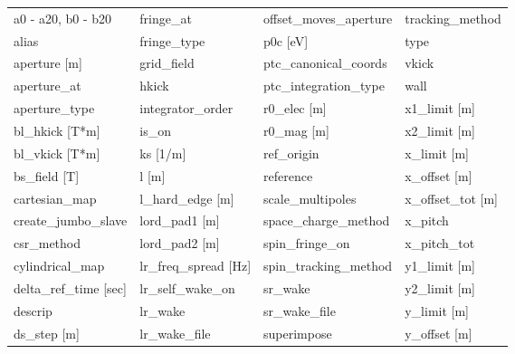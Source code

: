  \begin{tabular}{llll} \toprule
a0 - a20, b0 - b20             & fringe_at                      & offset_moves_aperture          & tracking_method                \\
alias                          & fringe_type                    & p0c [eV]                       & type                           \\
aperture [m]                   & grid_field                     & ptc_canonical_coords           & vkick                          \\
aperture_at                    & hkick                          & ptc_integration_type           & wall                           \\
aperture_type                  & integrator_order               & r0_elec [m]                    & x1_limit [m]                   \\
bl_hkick [T*m]                 & is_on                          & r0_mag [m]                     & x2_limit [m]                   \\
bl_vkick [T*m]                 & ks [1/m]                       & ref_origin                     & x_limit [m]                    \\
bs_field [T]                   & l [m]                          & reference                      & x_offset [m]                   \\
cartesian_map                  & l_hard_edge [m]                & scale_multipoles               & x_offset_tot [m]               \\
create_jumbo_slave             & lord_pad1 [m]                  & space_charge_method            & x_pitch                        \\
csr_method                     & lord_pad2 [m]                  & spin_fringe_on                 & x_pitch_tot                    \\
cylindrical_map                & lr_freq_spread [Hz]            & spin_tracking_method           & y1_limit [m]                   \\
delta_ref_time [sec]           & lr_self_wake_on                & sr_wake                        & y2_limit [m]                   \\
descrip                        & lr_wake                        & sr_wake_file                   & y_limit [m]                    \\
ds_step [m]                    & lr_wake_file                   & superimpose                    & y_offset [m]                   \\

\end{tabular}
